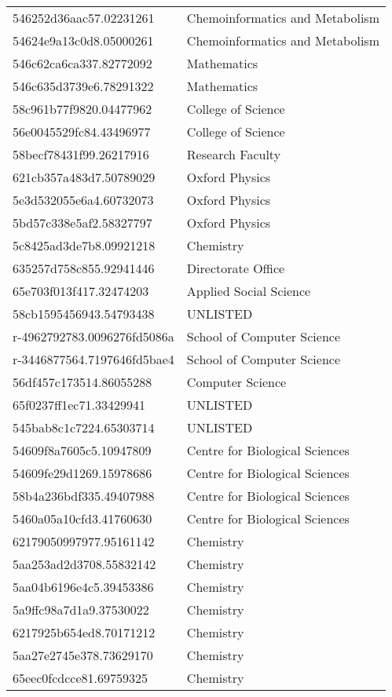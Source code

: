 \begin{tabular}{ll}
546252d36aac57.02231261 & Chemoinformatics and Metabolism \\
54624e9a13c0d8.05000261 & Chemoinformatics and Metabolism \\
546c62ca6ca337.82772092 & Mathematics \\
546c635d3739e6.78291322 & Mathematics \\
58c961b77f9820.04477962 & College of Science \\
56e0045529fc84.43496977 & College of Science \\
58becf78431f99.26217916 & Research Faculty \\
621cb357a483d7.50789029 & Oxford Physics \\
5e3d532055e6a4.60732073 & Oxford Physics \\
5bd57c338e5af2.58327797 & Oxford Physics \\
5c8425ad3de7b8.09921218 & Chemistry \\
635257d758c855.92941446 & Directorate Office \\
65e703f013f417.32474203 & Applied Social Science \\
58cb1595456943.54793438 & UNLISTED \\
r-4962792783.0096276fd5086a & School of Computer Science \\
r-3446877564.7197646fd5bae4 & School of Computer Science \\
56df457c173514.86055288 & Computer Science \\
65f0237ff1ec71.33429941 & UNLISTED \\
545bab8c1c7224.65303714 & UNLISTED \\
54609f8a7605c5.10947809 & Centre for Biological Sciences \\
54609fe29d1269.15978686 & Centre for Biological Sciences \\
58b4a236bdf335.49407988 & Centre for Biological Sciences \\
5460a05a10cfd3.41760630 & Centre for Biological Sciences \\
62179050997977.95161142 & Chemistry \\
5aa253ad2d3708.55832142 & Chemistry \\
5aa04b6196e4c5.39453386 & Chemistry \\
5a9ffc98a7d1a9.37530022 & Chemistry \\
6217925b654ed8.70171212 & Chemistry \\
5aa27e2745e378.73629170 & Chemistry \\
65eec0fcdcce81.69759325 & Chemistry \\

\end{tabular}
